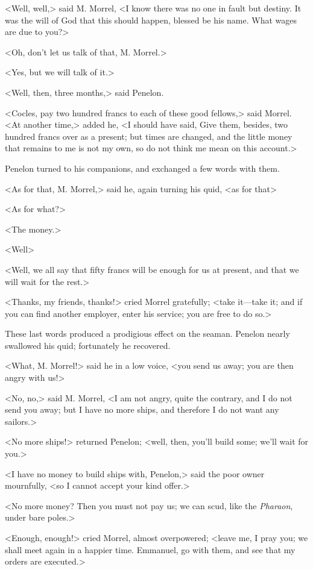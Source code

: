  <Well, well,> said M. Morrel, <I know there was no one in fault but destiny. It was the will of God that this should happen, blessed be his name. What wages are due to you?> 

 <Oh, don't let us talk of that, M. Morrel.> 

 <Yes, but we will talk of it.> 

 <Well, then, three months,> said Penelon. 

 <Cocles, pay two hundred francs to each of these good fellows,> said Morrel. <At another time,> added he, <I should have said, Give them, besides, two hundred francs over as a present; but times are changed, and the little money that remains to me is not my own, so do not think me mean on this account.> 

 Penelon turned to his companions, and exchanged a few words with them. 

 <As for that, M. Morrel,> said he, again turning his quid, <as for that\longdash> 

 <As for what?> 

 <The money.> 

 <Well\longdash> 

 <Well, we all say that fifty francs will be enough for us at present, and that we will wait for the rest.> 

 <Thanks, my friends, thanks!> cried Morrel gratefully; <take it—take it; and if you can find another employer, enter his service; you are free to do so.> 

 These last words produced a prodigious effect on the seaman. Penelon nearly swallowed his quid; fortunately he recovered. 

 <What, M. Morrel!> said he in a low voice, <you send us away; you are then angry with us!> 

 <No, no,> said M. Morrel, <I am not angry, quite the contrary, and I do not send you away; but I have no more ships, and therefore I do not want any sailors.> 

 <No more ships!> returned Penelon; <well, then, you'll build some; we'll wait for you.> 

 <I have no money to build ships with, Penelon,> said the poor owner mournfully, <so I cannot accept your kind offer.> 

 <No more money? Then you must not pay us; we can scud, like the \textit{Pharaon}, under bare poles.> 

 <Enough, enough!> cried Morrel, almost overpowered; <leave me, I pray you; we shall meet again in a happier time. Emmanuel, go with them, and see that my orders are executed.> 

